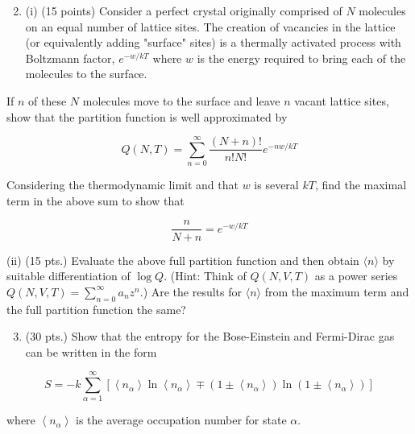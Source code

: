 \documentclass[10pt]{article}
\begin{document}
\begin{enumerate}
  \setcounter{enumi}{1}
  \item (i) (15 points) Consider a perfect crystal originally comprised of $N$ molecules on an equal number of lattice sites. The creation of vacancies in the lattice (or equivalently adding "surface" sites) is a thermally activated process with Boltzmann factor, $e^{-w / k T}$ where $w$ is the energy required to bring each of the molecules to the surface.
\end{enumerate}

If $n$ of these $N$ molecules move to the surface and leave $n$ vacant lattice sites, show that the partition function is well approximated by

$$
Q(N, T)=\sum_{n=0}^{\infty} \frac{(N+n) !}{n ! N !} e^{-n w / k T}
$$

Considering the thermodynamic limit and that $w$ is several $k T$, find the maximal term in the above sum to show that

$$
\frac{n}{N+n}=e^{-w / k T}
$$

(ii) (15 pts.) Evaluate the above full partition function and then obtain $\langle n\rangle$ by suitable differentiation of $\log Q$. (Hint: Think of $Q(N, V, T)$ as a power series $Q(N, V, T)=\sum_{n=0}^{\infty} a_{n} z^{n}$.) Are the results for $\langle n\rangle$ from the maximum term and the full partition function the same?

\begin{enumerate}
  \setcounter{enumi}{2}
  \item (30 pts.) Show that the entropy for the Bose-Einstein and Fermi-Dirac gas can be written in the form
\end{enumerate}

$$
S=-k \sum_{\alpha=1}^{\infty}\left[\left\langle n_{\alpha}\right\rangle \ln \left\langle n_{\alpha}\right\rangle \mp\left(1 \pm\left\langle n_{\alpha}\right\rangle\right) \ln \left(1 \pm\left\langle n_{\alpha}\right\rangle\right)\right]
$$

where $\left\langle n_{\alpha}\right\rangle$ is the average occupation number for state $\alpha$.
\end{document}
